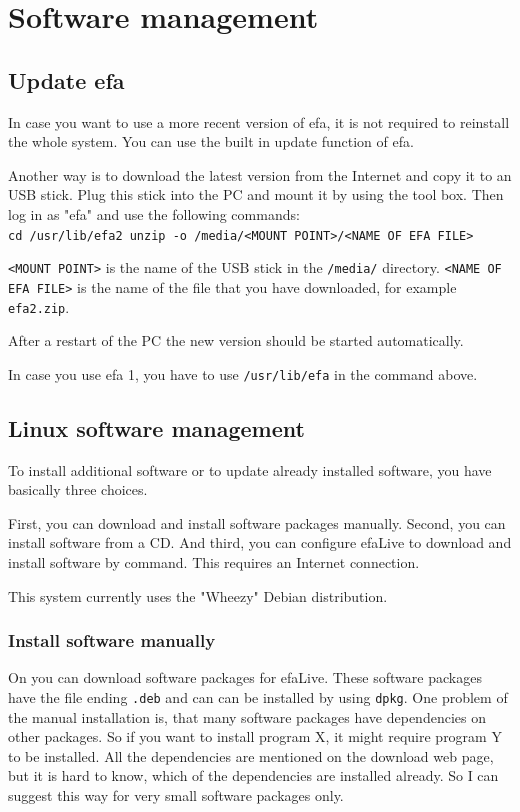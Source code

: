 \documentclass[a4paper,12pt,twoside]{article}
\begin{document}
\section{Software management}
\label{sct:software_management}
\subsection{Update efa}
\label{sct:update_efa}
In case you want to use a more recent version of efa, it is not required
to reinstall the whole system. You can use the built in update function
of efa.

Another way is to download the latest version from the Internet
\cite{EFA1} and copy it to an USB stick. Plug this stick into the PC
and mount it by using the tool box. Then log in as
"efa" and use the following commands:
\bigskip
\\
\texttt{cd /usr/lib/efa2
unzip -o /media/{\textless}MOUNT POINT{\textgreater}/{\textless}NAME OF
EFA FILE{\textgreater}}

\bigskip
\texttt{{\textless}MOUNT POINT{\textgreater}} is the name of the USB stick in the
\texttt{/media/} directory. \texttt{{\textless}NAME OF EFA FILE{\textgreater}} is the
name of the file that you have downloaded, for example
\texttt{efa2.zip}.

After a restart of the PC the new version should be started
automatically.

In case you use efa 1, you have to use \texttt{/usr/lib/efa} in the command
above.


\subsection{Linux software management}
\label{sct:linux_software}
To install additional software or to update already installed software,
you have basically three choices.

First, you can download and install software packages manually. Second,
you can install software from a CD. And third, you can configure
efaLive to download and install software by command. This requires an
Internet connection.

This system currently uses the "Wheezy" Debian distribution.


\subsubsection{Install software manually}
\label{sct:software_manually}
On \cite{DEB3} you can download software packages for efaLive. These
software packages have the file ending
\texttt{.deb} and can can be installed by using
\texttt{dpkg}. One problem of the manual
installation is, that many software packages have dependencies on other
packages. So if you want to install program X, it might require program
Y to be installed. All the dependencies are mentioned on the download
web page, but it is hard to know, which of the dependencies are
installed already. So I can suggest this way for very small software
packages only.
\end{document}
